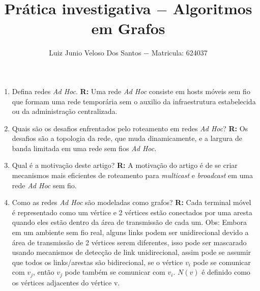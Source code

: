 \documentclass[a4paper,11pt,fleqn]{article}
\title{\vspace{-4cm}Prática investigativa $-$ Algoritmos em Grafos}
\author{Luiz Junio Veloso Dos Santos $-$ Matricula: 624037}
\begin{document}
\maketitle


\begin{enumerate}
    \item{Defina redes \textit{Ad Hoc}.}
    \newline
    \textbf{R:}
        Uma rede \textit{Ad Hoc} consiste em hosts móveis sem fio que formam uma rede
        temporária sem o auxilio da infraestrutura estabelecida ou da administração
        centralizada.

    \item{Quais são os desafios enfrentados pelo roteamento em redes \textit{Ad Hoc}?}
    \newline
    \textbf{R:}
        Os desafios são a topologia da rede, que muda dinamicamente, e
        a largura de banda limitada em uma rede sem fios \textit{Ad Hoc}.

    \item{Qual é a motivação deste artigo?}
    \newline
    \textbf{R:}
        A motivação do artigo é de se criar mecanismos mais eficientes de roteamento
        para \textit{multicast} e \textit{broadcast} em uma rede \textit{Ad Hoc} sem fio.

    \item{Como as redes \textit{Ad Hoc} são modeladas como grafos?}
    \newline
    \textbf{R:}
        Cada terminal móvel é representado como um vértice e
        2 vértices estão conectados por uma aresta quando eles estão dentro
        da área de transmissão de cada um.
        \newline
        Obs: Embora em um ambiente sem fio real, alguns links podem ser unidirecional
        devido a área de transmissão de 2 vértices serem diferentes, isso pode ser mascarado
        usando mecanismos de detecção de link unidirecional, assim pode se assumir
        que todos os links/arestas são bidirecional, se o vértice $v_i$ pode se
        comunicar com $v_j$, então $v_j$ pode também se comunicar com $v_i$.
        \newline
        $N(v)$ é definido como os vértices adjacentes do vértice v.


\end{enumerate}
\end{document}
